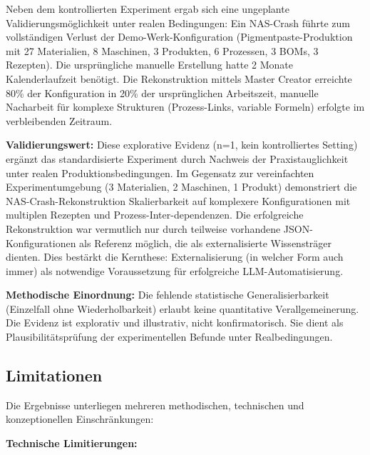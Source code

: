 Neben dem kontrollierten Experiment ergab sich eine ungeplante Validierungsmöglichkeit unter realen Bedingungen: Ein NAS-Crash führte zum vollständigen Verlust der Demo-Werk-Konfiguration (Pigmentpaste-Produktion mit 27 Materialien, 8 Maschinen, 3 Produkten, 6 Prozessen, 3 BOMs, 3 Rezepten). Die ursprüngliche manuelle Erstellung hatte 2 Monate Kalenderlaufzeit benötigt. Die Rekonstruktion mittels Master Creator erreichte 80\% der Konfiguration in 20\% der ursprünglichen Arbeitszeit, manuelle Nacharbeit für komplexe Strukturen (Prozess-Links, variable Formeln) erfolgte im verbleibenden Zeitraum.

\noindent \textbf{Validierungswert:} Diese explorative Evidenz (n=1, kein kontrolliertes Setting) ergänzt das standardisierte Experiment durch Nachweis der Praxistauglichkeit unter realen Produktionsbedingungen. Im Gegensatz zur vereinfachten Experimentumgebung (3 Materialien, 2 Maschinen, 1 Produkt) demonstriert die NAS-Crash-Rekonstruktion Skalierbarkeit auf komplexere Konfigurationen mit multiplen Rezepten und Prozess-Inter-dependenzen. Die erfolgreiche Rekonstruktion war vermutlich nur durch teilweise vorhandene JSON-Konfigurationen als Referenz möglich, die als externalisierte Wissensträger dienten. Dies bestärkt die Kernthese: Externalisierung (in welcher Form auch immer) als notwendige Voraussetzung für erfolgreiche LLM-Automatisierung.

\noindent \textbf{Methodische Einordnung:} Die fehlende statistische Generalisierbarkeit (Einzelfall ohne Wiederholbarkeit) erlaubt keine quantitative Verallgemeinerung. Die Evidenz ist explorativ und illustrativ, nicht konfirmatorisch. Sie dient als Plausibilitätsprüfung der experimentellen Befunde unter Realbedingungen.


\subsection{Limitationen}
\label{subsec:Limitationen}

Die Ergebnisse unterliegen mehreren methodischen, technischen und konzeptionellen Einschränkungen:

\noindent \textbf{Technische Limitierungen:}

